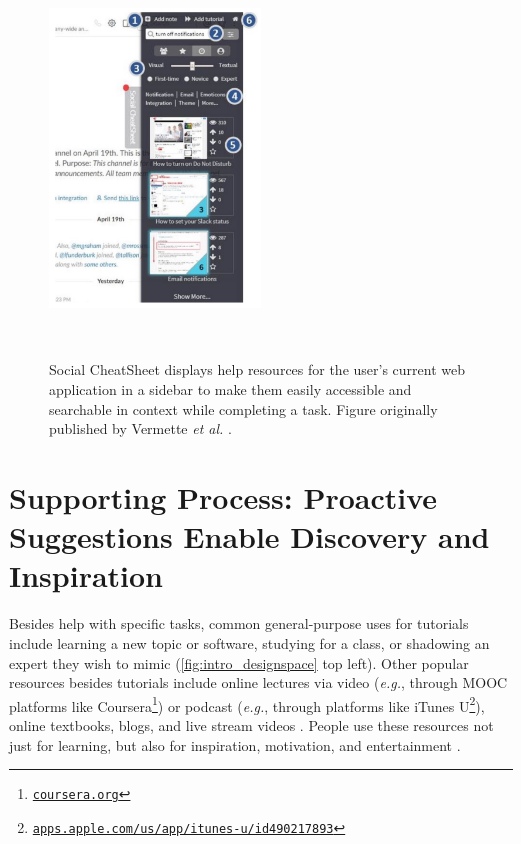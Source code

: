 \begin{figure}[t!]
\centering
  \includegraphics[width=0.5\textwidth]{figures/social-cheatsheet.png}
  \caption{Social CheatSheet displays help resources for the user's current web application in a sidebar to make them easily accessible and searchable in context while completing a task. Figure originally published by Vermette \textit{et al.} \cite{Vermette2017}.}~\label{fig:intro_cheatsheet}
\end{figure}

\section{Supporting Process: Proactive Suggestions Enable Discovery and Inspiration}
Besides help with specific tasks, common general-purpose uses for tutorials include learning a new topic or software, studying for a class, or shadowing an expert they wish to mimic \cite{Lafreniere2013a} (\autoref{fig:intro_designspace} top left). Other popular resources besides tutorials include online lectures via video (\textit{e.g.}, through MOOC platforms like Coursera\footnote{\href{https://www.coursera.org/}{\nolinkurl{coursera.org}}}) or podcast (\textit{e.g.}, through platforms like iTunes U\footnote{\href{https://apps.apple.com/us/app/itunes-u/id490217893}{\nolinkurl{apps.apple.com/us/app/itunes-u/id490217893}}}), online textbooks, blogs, and live stream videos \cite{Lu2019}. People use these resources not just for learning, but also for inspiration, motivation, and entertainment \cite{Lu2018, Hilvert-Bruce2018, Lu2019, Cheung2011}.


